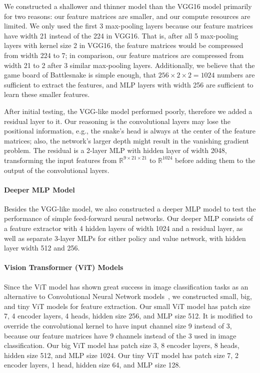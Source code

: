 \documentclass[conference]{IEEEtran}
\begin{document}
We constructed a shallower and thinner model than the VGG16 model primarily for
two reasons: our feature matrices are smaller,
and our compute resources are limited.
We only used the first 3 max-pooling layers because our feature matrices have
width 21 instead of the 224 in VGG16. That is,
after all 5 max-pooling layers with kernel size 2 in VGG16,
the feature matrices would be compressed from width 224 to 7; in comparison,
our feature matrices are compressed from width 21 to 2 after 3 similar
max-pooling layers.
Additionally, we believe that the game board of Battlesnake is simple enough,
that $256\times 2\times 2=1024$ numbers are sufficient to extract the features,
and MLP layers with width 256 are sufficient to learn these smaller features.

After initial testing, the VGG-like model performed poorly,
therefore we added a residual layer to it.
Our reasoning is the convolutional layers may lose the positional information,
e.g., the snake's head is always at the center of the feature matrices;
also, the network's larger depth might result in the vanishing gradient problem.
The residual is a 2-layer MLP with hidden layer of width 2048,
transforming the input features from $\mathbb R^{9\times 21\times 21}$ to
$\mathbb R^{1024}$ before adding them to the output of the convolutional layers.

\paragraph{Deeper MLP Model}
Besides the VGG-like model,
we also constructed a deeper MLP model to test the performance of simple
feed-forward neural networks.
Our deeper MLP consists of a feature extractor with 4 hidden layers of width
1024 and a residual layer,
as well as separate 3-layer MLPs for either policy and value network,
with hidden layer width 512 and 256.

\paragraph{Vision Transformer (ViT) Models}
Since the ViT model has shown great success in image classification tasks as an
alternative to Convolutional Neural Network models~\cite{dosovitskiy2020image},
we constructed small, big, and tiny ViT models for feature extraction.
Our small ViT model has patch size 7, 4 encoder layers, 4 heads, hidden size 256,
and MLP size 512.
It is modified to override the convolutional kernel to have input channel size 9
instead of 3,
because our feature matrices have 9 channels instead of the 3 used in image
classification.
Our big ViT model has patch size 3, 8 encoder layers, 8 heads, hidden size 512,
and MLP size 1024.
Our tiny ViT model has patch size 7, 2 encoder layers, 1 head, hidden size 64,
and MLP size 128.
\end{document}
